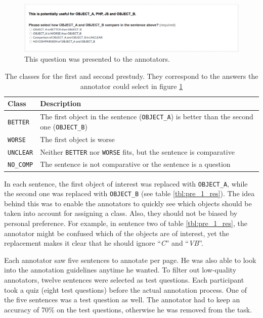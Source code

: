 \begin{figure}[h]
\centering
\caption{This question was presented to the annotators.}
\label{img:1_question}
\includegraphics[width=1\linewidth]{images/prestudy/1_question}

\end{figure}

\begin{table}[h]
\centering
\caption{The classes for the first and second prestudy. They correspond to the answers the annotator could select in figure \ref{img:1_question}}
\label{tbl:prestudyclasses-a}
\begin{tabularx}{\linewidth}{lX}

\toprule
Class & Description \\ \midrule
\texttt{BETTER} & The first object in the sentence (\texttt{OBJECT\_A}) is better than the second one (\texttt{OBJECT\_B})\\
\texttt{WORSE} & The first object is worse \\
\texttt{UNCLEAR} & Neither \texttt{BETTER} nor \texttt{WORSE} fits, but the sentence is comparative\\
\texttt{NO\_COMP} & The sentence is not comparative or the sentence is a question\\
\bottomrule
\end{tabularx}
\end{table}

In each sentence, the first object of interest was replaced with \texttt{OBJECT\_A}, while the second one was replaced with \texttt{OBJECT\_B} (see table \ref{tbl:pre_1_res}). The idea behind this was to enable the annotators to quickly see which objects should be taken into account for assigning a class. Also, they should not be biased by personal preference. For example, in sentence two of table \ref{tbl:pre_1_res}, the annotator might be confused which of the objects are of interest, yet the replacement makes it clear that he should ignore \enquote{\emph{C}} and \enquote{\emph{VB}}. 

Each annotator saw five sentences to annotate per page. He was also able to look into the annotation guidelines anytime he wanted. To filter out low-quality annotators, twelve sentences were selected as test questions. Each participant took a quiz (eight test questions) before the actual annotation process. One of the five sentences was a test question as well. The annotator had to keep an accuracy of 70\% on the test questions, otherwise he was removed from the task.


